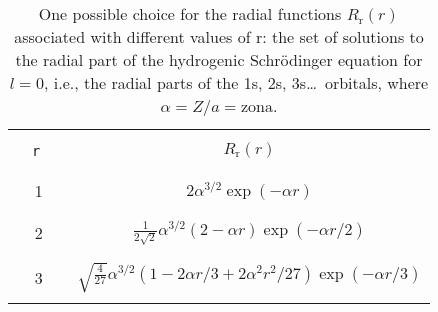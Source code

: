 \begin{table}
\begin{center}
\begin{tabular}{|cc|}
\hline\hline
&\\
\ \ \verb#r# \ \ & $R_{\mathrm{r}}(r)$ \\
&\\\hline&\\
1        &  $2 \alpha^{3/2}\exp(-\alpha r)$ \\
&\\\hline&\\
2        &  $\frac{1}{2\sqrt{2}}\alpha^{3/2}(2-\alpha
r)\exp(-\alpha r/2)$ \\
&\\\hline&\\
3        &  $\sqrt{\frac{4}{27}}\alpha^{3/2}(1-2\alpha
r/3+2\alpha^{2}r^{2}/27)\exp(-\alpha r/3)$ \\
&\\\hline\hline
\end{tabular}
\caption{ One possible choice for the radial functions
  $R_{\mathrm{r}}(r)$ associated with different values of 
r: the set of
solutions to the radial part of the hydrogenic Schr\"{o}dinger
equation for $l=0$, i.e., the radial parts of the 1s,
2s, 3s\ldots\ orbitals, where $\alpha=Z/a=\mathrm{zona}$. \label{tab:radial}}
\end{center}
\end{table}
